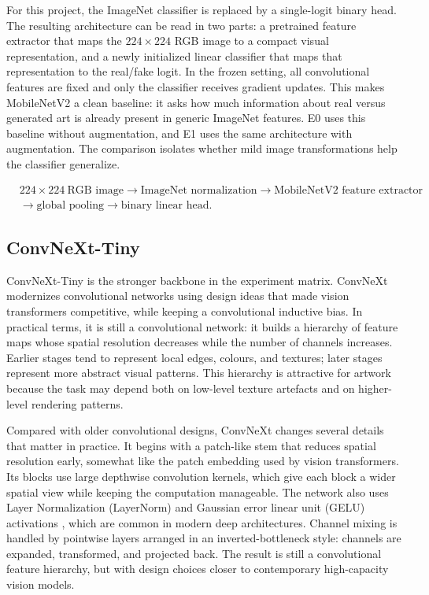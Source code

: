 \documentclass[11pt,a4paper]{article}
\begin{document}
For this project, the ImageNet classifier is replaced by a single-logit binary
head. The resulting architecture can be read in two parts: a pretrained
feature extractor that maps the \(224\times224\) RGB image to a compact visual
representation, and a newly initialized linear classifier that maps that
representation to the real/fake logit. In the frozen setting, all
convolutional features are fixed and only the classifier receives gradient
updates. This makes MobileNetV2 a clean baseline: it asks how much information
about real versus generated art is already present in generic ImageNet
features. E0 uses this baseline without augmentation, and E1 uses the same
architecture with augmentation. The comparison isolates whether mild image
transformations help the classifier generalize.

\[
  \begin{aligned}
  &224{\times}224\ \text{RGB image}
  \rightarrow
  \text{ImageNet normalization}
  \rightarrow
  \text{MobileNetV2 feature extractor} \\
  &\rightarrow
  \text{global pooling}
  \rightarrow
  \text{binary linear head}.
  \end{aligned}
\]

\subsection{ConvNeXt-Tiny}

ConvNeXt-Tiny is the stronger backbone in the experiment matrix. ConvNeXt
modernizes convolutional networks using design ideas that made vision
transformers competitive, while keeping a convolutional inductive bias. In
practical terms, it is still a convolutional network: it
builds a hierarchy of feature maps whose spatial resolution decreases while
the number of channels increases. Earlier stages tend to represent local
edges, colours, and textures; later stages represent more abstract visual
patterns. This hierarchy is attractive for artwork because the task may depend
both on low-level texture artefacts and on higher-level rendering patterns.

Compared with older convolutional designs, ConvNeXt changes several details
that matter in practice. It begins with a patch-like stem that reduces spatial
resolution early, somewhat like the patch embedding used by vision
transformers. Its blocks use large depthwise convolution kernels, which give
each block a wider spatial view while keeping the computation manageable. The
network also uses Layer Normalization (LayerNorm) \cite{ba2016layernorm} and
Gaussian error linear unit (GELU) activations \cite{hendrycks2016gelu}, which
are common in modern deep architectures. Channel mixing is handled by
pointwise layers arranged in an inverted-bottleneck style: channels are
expanded, transformed, and projected back. The result is still a convolutional
feature hierarchy, but with design choices closer to contemporary high-capacity
vision models.
\end{document}
